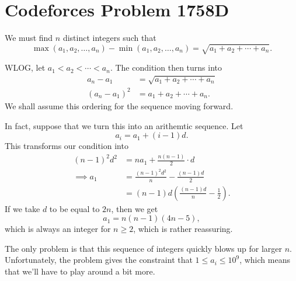 \documentclass[a4paper, 12pt]{article}
\begin{document}
\section*{Codeforces Problem 1758D}

\begin{chirpbox}
\begin{problem}
We must find \( n \) distinct integers such that
\[
    \max(a_1, a_2, \ldots, a_n) - \min(a_1, a_2, \ldots, a_n) = \sqrt{a_1 + a_2 + \cdots + a_n}
.\]
\end{problem}
\end{chirpbox}

\begin{observation}
WLOG, let \( a_1 < a_2 < \cdots < a_n \). The condition then turns into
\begin{align*}
    a_n - a_1 &= \sqrt{a_1 + a_2 + \cdots + a_n} \\
    (a_n - a_1)^2 &= a_1 + a_2 + \cdots + a_n
.\end{align*}
We shall assume this ordering for the sequence moving forward.
\end{observation}

\begin{solution}[\textcolor{red}{Invalid, Integer Overflow}]
In fact, suppose that we turn this into an arithemtic sequence. Let
\[
    a_i = a_1 + (i-1)d
.\]
This transforms our condition into
\begin{align*}
    (n-1)^2 d^2 &= n a_1 + \frac{n(n-1)}{2} \cdot d \\
    \implies a_1 &= \frac{(n-1)^2 d^2}{n} - \frac{(n-1)d}{2} \\
    &= (n-1)d \left( \frac{(n-1)d}{n} - \frac{1}{2} \right)
.\end{align*}
If we take \( d \) to be equal to \( 2n \), then we get
\[
    a_1 = n(n-1)(4n - 5)
,\]
which is always an integer for \( n \ge 2 \), which is rather reassuring.

The only problem is that this sequence of integers quickly blows up for larger \( n \). Unfortunately, the problem gives the constraint that \( 1 \le a_i \le 10^9 \), which means that we'll have to play around a bit more.
\end{solution}
\end{document}
